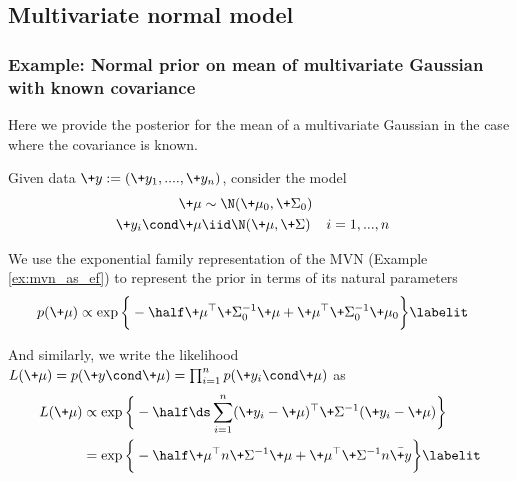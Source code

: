 \documentclass{article} %
\begin{document}
 
 
\subsection{Multivariate normal model}
 
\subsubsection{Example:  Normal prior on mean of multivariate Gaussian with known covariance}  \label{sec:normal_prior_on_mvn_with_known_covariance}
 
 
Here we provide the posterior for the mean of a multivariate Gaussian in the case where the covariance is known.

Given data $\+y :=(\+y_1, ....,\+y_n)$, consider the model
\begin{align*}
\+\mu &\sim \N(\+\mu_0, \+\Sigma_0) \\
\+y_i \cond \+\mu &\iid \N(\+\mu, \+\Sigma) && i=1,...,n
\end{align*}




We use the exponential family representation of the MVN (Example \ref{ex:mvn_as_ef}) to represent the prior in terms of its natural parameters
\begin{align*}
	p(\+\mu) &\propto \exp \bigg\{ -\half \+\mu^\top \+\Sigma_0^{-1} \+\mu + \+\mu^\top \+\Sigma_0^{-1} \+\mu_0 \bigg\} 
\labelit \label{eqn:prior_for_mvn_fixed_cov}
\end{align*}

And similarly, we write the likelihood $	L(\+\mu) = p(\+y \cond \+\mu) = \prod_{i=1}^n p(\+y_i \cond \+\mu)$  as
\begin{align*}
	L(\+\mu) &\propto \exp \bigg\{ -\half \ds\sum_{i=1}^n (\+y_i - \+\mu)^\top \+\Sigma^{-1} (\+y_i - \+\mu)\bigg\}  \\
	&= \exp \bigg\{ - \half \+\mu^\top n \+\Sigma^{-1} \+\mu + \+\mu^\top \+\Sigma^{-1} n \bar{\+y} \bigg\} 
\labelit \label{eqn:likelihood_for_mvn_fixed_cov}
\end{align*}
\end{document}
